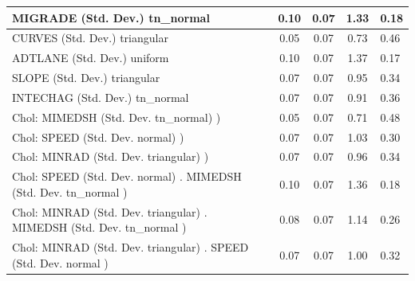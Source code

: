 \begin{table}
\begin{center}
\begin{tabular}{|l|l|c|c|c|l|}
			\hline
			MIGRADE (Std. Dev.) tn_normal &  & 0.10 & 0.07 & 1.33 & 0.18 \\
			\hline
			CURVES (Std. Dev.) triangular &  & 0.05 & 0.07 & 0.73 & 0.46 \\
			\hline
			ADTLANE (Std. Dev.) uniform &  & 0.10 & 0.07 & 1.37 & 0.17 \\
			\hline
			SLOPE (Std. Dev.) triangular &  & 0.07 & 0.07 & 0.95 & 0.34 \\
			\hline
			INTECHAG (Std. Dev.) tn_normal &  & 0.07 & 0.07 & 0.91 & 0.36 \\
			\hline
			 Chol: MIMEDSH (Std. Dev. tn_normal) ) &  & 0.05 & 0.07 & 0.71 & 0.48 \\
			\hline
			 Chol: SPEED (Std. Dev. normal) ) &  & 0.07 & 0.07 & 1.03 & 0.30 \\
			\hline
			 Chol: MINRAD (Std. Dev. triangular) ) &  & 0.07 & 0.07 & 0.96 & 0.34 \\
			\hline
			 Chol: SPEED (Std. Dev. normal) . MIMEDSH (Std. Dev.   tn_normal ) &  & 0.10 & 0.07 & 1.36 & 0.18 \\
			\hline
			 Chol: MINRAD (Std. Dev. triangular) . MIMEDSH (Std. Dev.   tn_normal ) &  & 0.08 & 0.07 & 1.14 & 0.26 \\
			\hline
			 Chol: MINRAD (Std. Dev. triangular) . SPEED (Std. Dev.   normal ) &  & 0.07 & 0.07 & 1.00 & 0.32 \\
			\hline
		\end{tabular}
	\end{center}
\end{table}